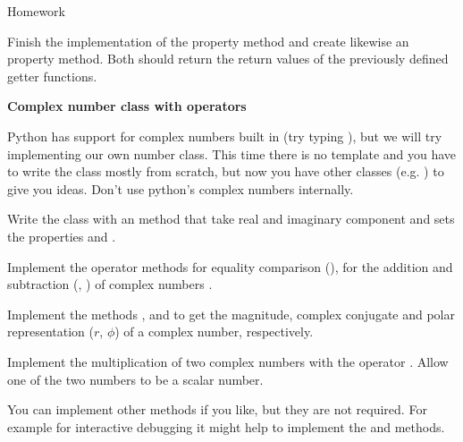 \documentclass[a4paper, draft=False]{scrartcl}
\begin{document}
\begin{exam}[Homework]{Homework}
\begin{instructions}
\begin{problem*}[\auto]
\begin{parts}
           Finish the implementation of the  property method and
           create likewise an  property method. Both should
           return the return values of the previously defined getter functions.
      \end{parts}
    \end{problem*}

\begin{problem*}[\auto]\textbf{Complex number class with operators}

  Python has support for complex numbers built in (try typing ),
  but we will try implementing our own  number class. This time there is
  no template and you have to write the class mostly from scratch, but now you
  have other classes (e.g. ) to give you ideas. Don't use python's
  complex numbers internally.
  \begin{parts}
  \item{} Write the class  with an  method
    that take real and imaginary component and sets the properties  and
    .
   \item{} Implement the operator methods for equality comparison
     (\py{==}), for the addition and subtraction (\py{+}, \py{-}) of complex numbers .
   \item{} Implement the methods ,  and
      to get the magnitude, complex conjugate and polar
     representation ($r$, $\phi$) of a complex number, respectively.
   \item{} Implement the multiplication of two complex numbers with the
     operator \py{*}. Allow one of the two numbers to be a scalar number.
  \end{parts}
  You can implement other methods if you like, but they are not required. For
  example for interactive debugging it might help to implement the 
  and  methods.
\end{problem*}


  \end{instructions}

\end{exam}
\end{document}
